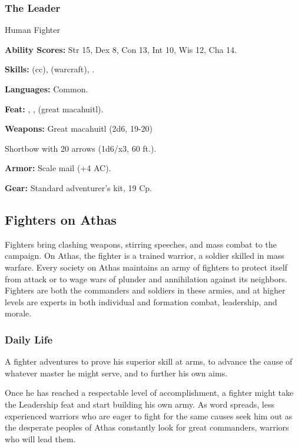 \subsubsection{The Leader}

Human Fighter

\textbf{Ability Scores:} Str 15, Dex 8, Con 13, Int 10, Wis 12, Cha 14.

\textbf{Skills:}  (cc),  (warcraft), .

\textbf{Languages:} Common.

\textbf{Feat:} , ,  (great macahuitl).

\textbf{Weapons:} Great macahuitl (2d6, 19-20)

Shortbow with 20 arrows (1d6/x3, 60 ft.).

\textbf{Armor:} Scale mail (+4 AC).

\textbf{Gear:} Standard adventurer's kit, 19 Cp.

\subsection{Fighters on Athas}

Fighters bring clashing weapons, stirring speeches, and mass combat to the campaign. On Athas, the fighter is a trained warrior, a soldier skilled in mass warfare. Every society on Athas maintains an army of fighters to protect itself from attack or to wage wars of plunder and annihilation against its neighbors. Fighters are both the commanders and soldiers in these armies, and at higher levels are experts in both individual and formation combat, leadership, and morale.

\subsubsection{Daily Life}

A fighter adventures to prove his superior skill at arms, to advance the cause of whatever master he might serve, and to further his own aims.

Once he has reached a respectable level of accomplishment, a fighter might take the Leadership feat and start building his own army. As word spreads, less experienced warriors who are eager to fight for the same causes seek him out as the desperate peoples of Athas constantly look for great commanders, warriors who will lead them.


